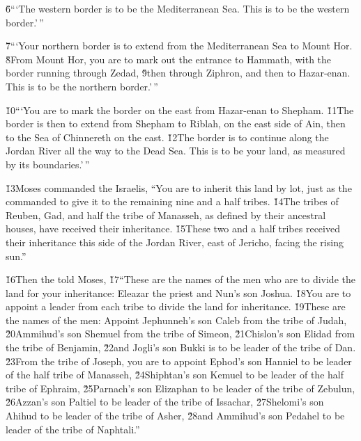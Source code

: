 \v{6}```The western border is to be the Mediterranean Sea. This is to be the western border.'\,''

\v{7}```Your northern border is to extend from the Mediterranean Sea to Mount Hor. \v{8}From Mount Hor, you are to mark out the entrance to Hammath, with the border running through Zedad, \v{9}then through Ziphron, and then to Hazar-enan. This is to be the northern border.'\,''

\v{10}```You are to mark the border on the east from Hazar-enan to Shepham. \v{11}The border is then to extend from Shepham to Riblah, on the east side of Ain, then to the Sea of Chinnereth on the east. \v{12}The border is to continue along the Jordan River all the way to the Dead Sea. This is to be your land, as measured by its boundaries.'\,''

\v{13}Moses commanded the Israelis, ``You are to inherit this land by lot, just as the  commanded to give it to the remaining nine and a half tribes. \v{14}The tribes of Reuben, Gad, and half the tribe of Manasseh, as defined by their ancestral houses, have received their inheritance. \v{15}These two and a half tribes received their inheritance this side of the Jordan River, east of Jericho, facing the rising sun.''

\v{16}Then the  told Moses, \v{17}``These are the names of the men who are to divide the land for your inheritance: Eleazar the priest and Nun's son Joshua. \v{18}You are to appoint a leader from each tribe to divide the land for inheritance. \v{19}These are the names of the men: Appoint Jephunneh's son Caleb from the tribe of Judah, \v{20}Ammihud's son Shemuel from the tribe of Simeon, \v{21}Chislon's son Elidad from the tribe of Benjamin, \v{22}and Jogli's son Bukki is to be leader of the tribe of Dan. \v{23}From the tribe of Joseph, you are to appoint Ephod's son Hanniel to be leader of the half tribe of Manasseh, \v{24}Shiphtan's son Kemuel to be leader of the half tribe of Ephraim, \v{25}Parnach's son Elizaphan to be leader of the tribe of Zebulun, \v{26}Azzan's son Paltiel to be leader of the tribe of Issachar, \v{27}Shelomi's son Ahihud to be leader of the tribe of Asher, \v{28}and Ammihud's son Pedahel to be leader of the tribe of Naphtali.''


